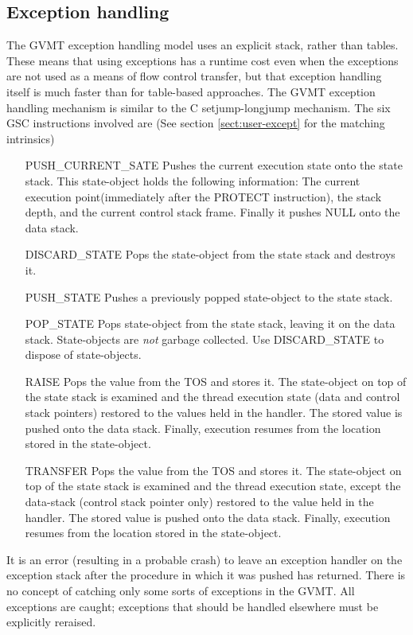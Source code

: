 \subsection{Exception handling}
The GVMT exception handling model uses an explicit stack, rather than tables. These means that using exceptions has a runtime cost even when the exceptions are not used as a means of flow control transfer, but that exception handling itself is much faster than for table-based approaches. The GVMT exception handling mechanism is similar to the C setjump-longjump mechanism.
The six GSC instructions involved are (See section \ref{sect:user-except} for the matching intrinsics)
\begin{itemize}
\item [PUSH_CURRENT_SATE] Pushes the current execution state onto the state stack. This state-object holds the following information: The current execution point(immediately after the PROTECT instruction), the stack depth, and the current control stack frame. Finally it pushes NULL onto the data stack. 
\item [DISCARD_STATE] Pops the state-object from the state stack and destroys it.
\item [PUSH_STATE] Pushes a previously popped state-object to the state stack.
\item [POP_STATE] Pops state-object from the state stack, leaving it on the data stack. State-objects are \emph{not} garbage collected. 
Use  DISCARD_STATE to dispose of state-objects.
\item [RAISE] Pops the value from the TOS and stores it. The state-object on top of the state stack is examined and the thread execution state (data and control stack pointers) restored to the values held in the handler. The stored value is pushed onto the data stack. Finally, execution resumes from the location stored in the state-object.
\item [TRANSFER] Pops the value from the TOS and stores it. The state-object on top of the state stack is examined and the thread execution state, except the data-stack (control stack pointer only) restored to the value held in the handler. The stored value is pushed onto the data stack. Finally, execution resumes from the location stored in the state-object.
\end{itemize}
It is an error (resulting in a probable crash) to leave an exception handler on the exception stack after the procedure in which it was pushed has returned.
There is no concept of catching only some sorts of exceptions in the GVMT. All exceptions are caught; exceptions that should be handled elsewhere must be explicitly reraised. 

